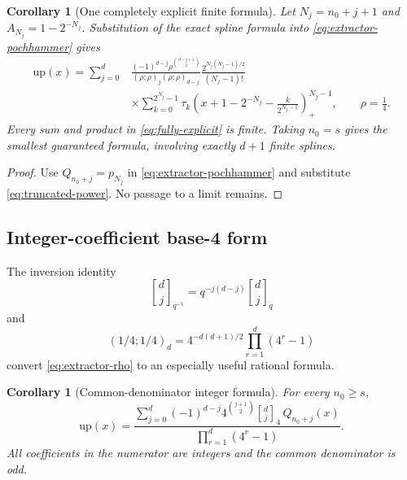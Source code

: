 \documentclass[11pt,oneside]{article}
\numberwithin{equation}{section}
\newtheorem{corollary}[theorem]{Corollary}
\theoremstyle{definition}
\theoremstyle{remark}
\newcommand{\upf}{\mathrm{up}}
\newcommand{\qbinom}[3]{\genfrac{[}{]}{0pt}{}{#1}{#2}_{#3}}
\newcommand{\TM}{\tau}
\begin{document}
\begin{corollary}[One completely explicit finite formula]
\label{cor:fully-explicit}
Let $N_j=n_0+j+1$ and $A_{N_j}=1-2^{-N_j}$.  Substitution of the exact spline
formula into \eqref{eq:extractor-pochhammer} gives
\begin{equation}
\boxed{\begin{aligned}
 \upf(x)=\sum_{j=0}^{d}&
 \frac{(-1)^{d-j}\rho^{\binom{d-j+1}{2}}}
 {(\rho;\rho)_j(\rho;\rho)_{d-j}}
 \frac{2^{N_j(N_j-1)/2}}{(N_j-1)!}\\[-0.1em]
 &\times\sum_{k=0}^{2^{N_j}-1}\TM_k
 \left(x+1-2^{-N_j}-\frac{k}{2^{N_j-1}}\right)_+^{N_j-1},
 \qquad \rho=\frac14.
\end{aligned}}
\label{eq:fully-explicit}
\end{equation}
Every sum and product in \eqref{eq:fully-explicit} is finite.  Taking $n_0=s$
gives the smallest guaranteed formula, involving exactly $d+1$ finite splines.
\end{corollary}

\begin{proof}
Use $Q_{n_0+j}=p_{N_j}$ in \eqref{eq:extractor-pochhammer} and substitute
\eqref{eq:truncated-power}.  No passage to a limit remains.
\end{proof}

\subsection{Integer-coefficient base-4 form}

The inversion identity
\begin{equation}
 \qbinom{d}{j}{q^{-1}}=q^{-j(d-j)}\qbinom{d}{j}{q}
 \label{eq:q-inversion}
\end{equation}
and
\begin{equation}
 (1/4;1/4)_d
 =4^{-d(d+1)/2}\prod_{r=1}^{d}(4^r-1)
 \label{eq:pochhammer-base4}
\end{equation}
convert \eqref{eq:extractor-rho} to an especially useful rational formula.

\begin{corollary}[Common-denominator integer formula]
For every $n_0\ge s$,
\begin{equation}
 \boxed{\displaystyle
 \upf(x)=
 \frac{\displaystyle\sum_{j=0}^{d}(-1)^{d-j}
 4^{\binom{j+1}{2}}\qbinom{d}{j}{4}\,Q_{n_0+j}(x)}
 {\displaystyle\prod_{r=1}^{d}(4^r-1)}.}
 \label{eq:extractor-base4}
\end{equation}
All coefficients in the numerator are integers and the common denominator is
odd.
\end{corollary}
\end{document}
